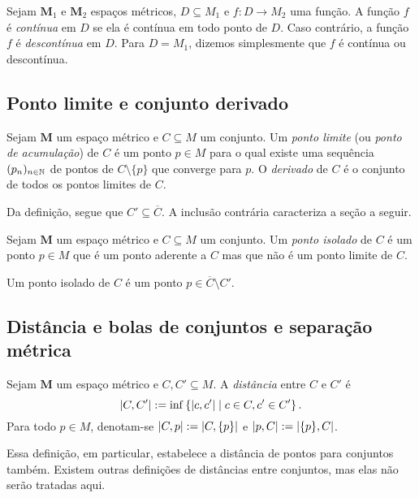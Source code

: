 \begin{definition}
Sejam $\bm M_1$ e $\bm M_2$ espaços métricos, $D \subseteq M_1$ e $f: D \to M_2$ uma função. A função $f$ é \emph{contínua} em $D$ se ela é contínua em todo ponto de $D$. Caso contrário, a função $f$ é \emph{descontínua} em $D$. Para $D=M_1$, dizemos simplesmente que $f$ é contínua ou descontínua.
\end{definition}

\subsection{Ponto limite e conjunto derivado}

\begin{definition}
Sejam $\bm M$ um espaço métrico e $C \subseteq M$ um conjunto. Um \emph{ponto limite} (ou \emph{ponto de acumulação}) de $C$ é um ponto $p \in M$ para o qual existe uma sequência $(p_n)_{n \in \mathbb{N}}$ de pontos de $C \setminus \{p\}$ que converge para $p$. O \emph{derivado} de $C$ é o conjunto de todos os pontos limites de $C$.
\end{definition}

Da definição, segue que $C' \subseteq \overline C$. A inclusão contrária caracteriza a seção a seguir.

\begin{definition}
Sejam $\bm M$ um espaço métrico e $C \subseteq M$ um conjunto. Um \emph{ponto isolado} de $C$ é um ponto $p \in M$ que é um ponto aderente a $C$ mas que não é um ponto limite de $C$.
\end{definition}

Um ponto isolado de $C$ é um ponto $p \in \overline C \setminus C'$.

\subsection{Distância e bolas de conjuntos e separação métrica}

\begin{definition}
Sejam $\bm M$ um espaço métrico e $C,C' \subseteq M$. A \emph{distância} entre $C$ e $C'$ é
	\begin{equation*}
	\left\vert{C},{C'}\right\vert := \inf \left\{{\left\vert{c},{c'}\right\vert}\;\middle\vert\;{c \in C, c' \in C'}\right\}.
	\end{equation*}
Para todo $p \in M$, denotam-se $\left\vert{C},{p}\right\vert := \left\vert{C},{\{p\}}\right\vert$ e $\left\vert{p},{C}\right\vert := \left\vert{\{p\}},{C}\right\vert$.
\end{definition}

Essa definição, em particular, estabelece a distância de pontos para conjuntos também. Existem outras definições de distâncias entre conjuntos, mas elas não serão tratadas aqui.

